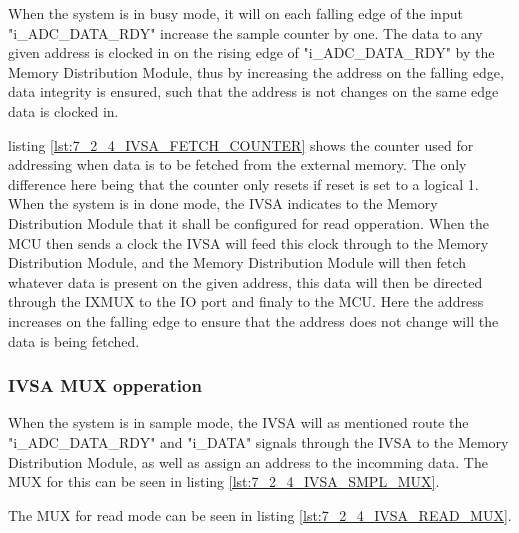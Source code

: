 When the system is in busy mode, it will on each falling edge of the input "i\_ADC\_DATA\_RDY" increase the sample counter by one. The data to any given address is clocked in on the rising edge of "i\_ADC\_DATA\_RDY" by the Memory Distribution Module, thus by increasing the address on the falling edge, data integrity is ensured, such that the address is not changes on the same edge data is clocked in.



listing \ref{lst:7_2_4_IVSA_FETCH_COUNTER} shows the counter used for addressing when data is to be fetched from the external memory. The only difference here being that the counter only resets if reset is set to a logical 1. When the system is in done mode, the IVSA indicates to the Memory Distribution Module that it shall be configured for read opperation. When the MCU then sends a clock the IVSA will feed this clock through to the Memory Distribution Module, and the Memory Distribution Module will then fetch whatever data is present on the given address, this data will then be directed through the IXMUX to the IO port and finaly to the MCU. Here the address increases on the falling edge to ensure that the address does not change will the data is being fetched. 



\subsubsection{IVSA MUX opperation}
When the system is in sample mode, the IVSA will as mentioned route the "i\_ADC\_DATA\_RDY" and "i\_DATA" signals through the IVSA to the Memory Distribution Module, as well as assign an address to the incomming data. The MUX for this can be seen in listing \ref{lst:7_2_4_IVSA_SMPL_MUX}. 



The MUX for read mode can be seen in listing \ref{lst:7_2_4_IVSA_READ_MUX}.



